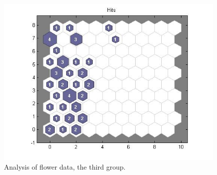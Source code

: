 \documentclass[a4paper]{article}
\begin{document}
  \begin{figure}[H] %
	 \includegraphics[scale=0.5]{q4_plotsom100_150.jpg}
	 \caption{\label{fig:plotg3} Analysis of flower data, the third group.}
 \end{figure}

 

\end{document}
